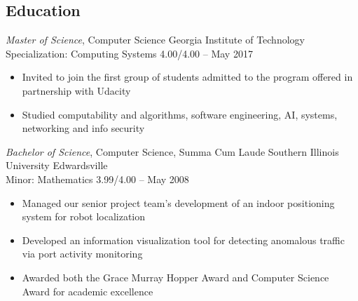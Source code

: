 \documentclass[margin,line]{resume}
\begin{document}
\begin{resume}
\section{Education}
{\small
  {\sl Master of Science}, Computer Science \hfill
  Georgia Institute of Technology\\
  Specialization: Computing Systems \hfill
  4.00/4.00 -- May 2017
}
\begin{itemize} \itemsep -2pt %
\small\item Invited to join the first group of students admitted to the program offered in partnership with Udacity
\small\item Studied computability and algorithms, software engineering, AI, systems, networking and info security
\end{itemize}

{\small
  {\sl Bachelor of Science}, Computer Science, Summa Cum Laude \hfill
  Southern Illinois University Edwardsville\\
  Minor: Mathematics \hfill
  3.99/4.00 -- May 2008
}
\begin{itemize} \itemsep -2pt %
\small\item Managed our senior project team's development of an indoor positioning system for robot localization
\small\item Developed an information visualization tool for detecting anomalous traffic via port activity monitoring
\small\item Awarded both the Grace Murray Hopper Award and Computer Science Award for academic excellence
\end{itemize}




\end{resume}
\end{document}
